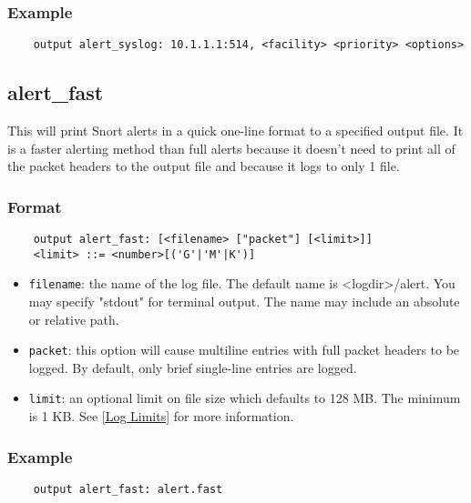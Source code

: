 \documentclass[english]{report}
\begin{document}
\subsubsection{Example}

\begin{verbatim}
    output alert_syslog: 10.1.1.1:514, <facility> <priority> <options>
\end{verbatim}

\subsection{alert\_fast}

This will print Snort alerts in a quick one-line format to a specified output
file. It is a faster alerting method than full alerts because it doesn't need
to print all of the packet headers to the output file and because it logs to
only 1 file.

\subsubsection{Format}

\begin{verbatim}
    output alert_fast: [<filename> ["packet"] [<limit>]]
    <limit> ::= <number>[('G'|'M'|K')]
\end{verbatim}

\begin{itemize}
\item \texttt{filename}: the name of the log file.  The default name is
<logdir>/alert.  You may specify "stdout" for terminal output.  The name may
include an absolute or relative path.

\item \texttt{packet}: this option will cause multiline entries with full
packet headers to be logged.  By default, only brief single-line entries are
logged.

\item \texttt{limit}: an optional limit on file size which defaults to 128 MB.  
The minimum is 1 KB.  See \ref{Log Limits} for more information.
\end{itemize}

\subsubsection{Example}

\begin{verbatim}
    output alert_fast: alert.fast
\end{verbatim}
\end{document}
